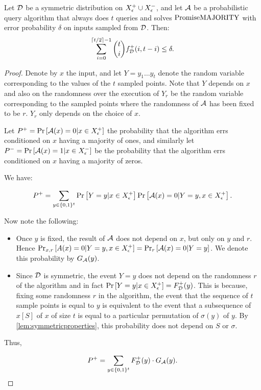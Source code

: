 \begin{lemma}
\label{lem:symmetricbound}
Let $\mathcal{D}$ be a symmetric distribution on $X^+_\epsilon \cup X^-_\epsilon$,
 and let $\mathcal{A}$ be a probabilistic query algorithm
that always does $t$ queries and solves $\mathrm{PromiseMAJORITY}$ with error probability $\delta$ 
on inputs sampled from $\mathcal{D}$. 
Then:
$$
\sum_{i=0}^{\lceil t/2 \rceil-1} \binom{t}{i} f^+_{\mathcal{D}}(i, t-i) \leq \delta.
$$
\end{lemma}
\begin{proof}
Denote by $x$ the input, and let $Y = y_1 \ldots y_t$ denote the random variable corresponding
to the values of the $t$ sampled points. Note that $Y$ depends on $x$ and also on the randomness
over the execution of $Y_r$ be the random variable corresponding to the sampled points where
the randomness of $\mathcal{A}$ has been fixed to be $r$. $Y_r$ only depends on the choice of $x$.

Let $P^+ = \text{Pr}\left[\mathcal{A}(x) = 0 | x \in X^+_\epsilon\right]$ the probability that the algorithm errs
conditioned on $x$ having a majority of ones, and similarly let 
$P^- = \text{Pr}\left[\mathcal{A}(x) = 1 | x \in X^-_\epsilon\right]$ be the probability that the algorithm errs conditioned
on $x$ having a majority of zeros.

We have:

$$
P^+ = \sum_{y\in \{0, 1\}^t} \text{Pr}\left[Y = y | x \in X^+_\epsilon\right] \text{Pr}\left[\mathcal{A}(x) = 0 | Y = y, x \in X^+_\epsilon\right].
$$

Now note the following:

\begin{itemize}
    \item Once $y$ is fixed, the result of $\mathcal{A}$ does not depend on $x$, but only on $y$ and $r$.
    Hence $\text{Pr}_{x,r}\left[A(x) = 0 | Y = y, x \in X^+_\epsilon\right] = \text{Pr}_{r}\left[\mathcal{A}(x) = 0 | Y = y\right]$.
    We denote this probability by $G_{\mathcal{A}}(y)$.
    \item Since $\mathcal{D}$ is symmetric, the event $Y = y$ does not depend on the
    randomness $r$ of the algorithm and in fact $\text{Pr}\left[Y = y | x \in X^+_\epsilon\right] = F^+_{\mathcal{D}}(y)$.
    This is because, fixing some randomness $r$ in the algorithm, the event that the sequence
    of $t$ sample points is equal to $y$ is equivalent to the event that a subsequence of
    $x[S]$ of $x$ of size $t$ is equal to a particular permutation of $\sigma(y)$ of $y$. 
    By \cref{lem:symmetricproperties}, this probability does not depend on $S$ or $\sigma$.
\end{itemize}

Thus, 

$$
P^+ = \sum_{y \in \{0, 1\}^t} F^+_{\mathcal{D}}(y) \cdot G_{\mathcal{A}}(y).
$$


\end{proof}
